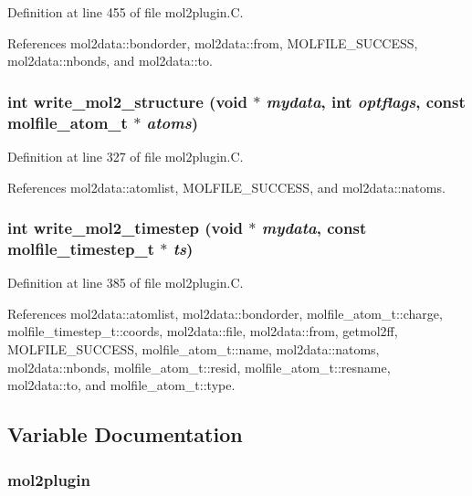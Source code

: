 Definition at line 455 of file mol2plugin.C.

References mol2data::bondorder, mol2data::from, MOLFILE\_\-SUCCESS, mol2data::nbonds, and mol2data::to.
\subsubsection{\setlength{\rightskip}{0pt plus 5cm}int write\_\-mol2\_\-structure (void $\ast$ {\em mydata}, int {\em optflags}, const {\bf molfile\_\-atom\_\-t} $\ast$ {\em atoms})\hspace{0.3cm}{\tt  [static]}}\label{mol2plugin_8C_a7}




Definition at line 327 of file mol2plugin.C.

References mol2data::atomlist, MOLFILE\_\-SUCCESS, and mol2data::natoms.
\subsubsection{\setlength{\rightskip}{0pt plus 5cm}int write\_\-mol2\_\-timestep (void $\ast$ {\em mydata}, const {\bf molfile\_\-timestep\_\-t} $\ast$ {\em ts})\hspace{0.3cm}{\tt  [static]}}\label{mol2plugin_8C_a9}




Definition at line 385 of file mol2plugin.C.

References mol2data::atomlist, mol2data::bondorder, molfile\_\-atom\_\-t::charge, molfile\_\-timestep\_\-t::coords, mol2data::file, mol2data::from, getmol2ff, MOLFILE\_\-SUCCESS, molfile\_\-atom\_\-t::name, mol2data::natoms, mol2data::nbonds, molfile\_\-atom\_\-t::resid, molfile\_\-atom\_\-t::resname, mol2data::to, and molfile\_\-atom\_\-t::type.

\subsection{Variable Documentation}
\subsubsection{ mol2plugin\hspace{0.3cm}{\tt  [static]}}\label{mol2plugin_8C_a1}


